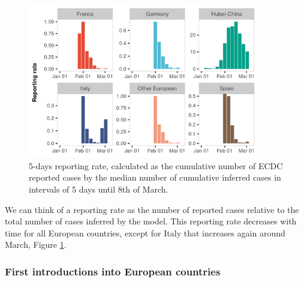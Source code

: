 \documentclass[12pt]{article}
\begin{document}
\begin{figure}[ht]
    \centering
    \includegraphics[width=0.9\textwidth]{201030_europe3_figtraj03.png}
    \caption{5-days reporting rate, calculated as the cumulative number of ECDC reported cases by the median number of cumulative inferred cases in intervals of 5 days until 8th of March. }
    \label{fig:reported}
\end{figure}

We can think of a reporting rate as the number of reported cases relative to the total number of cases inferred by the model. This reporting rate decreases with time for all European countries, except for Italy that increases again around March, Figure \ref{fig:reported}. 


\subsubsection*{First introductions into European countries}
\end{document}

